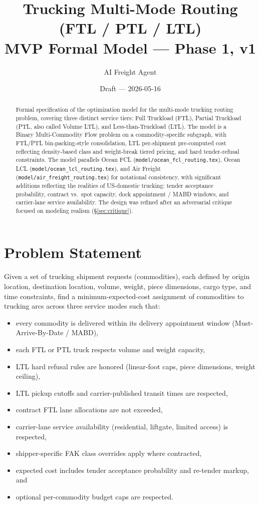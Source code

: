 \documentclass[11pt,a4paper]{article}
\title{\textbf{Trucking Multi-Mode Routing (FTL / PTL / LTL)}\\[0.4em]
\large MVP Formal Model --- Phase 1, v1}
\author{AI Freight Agent}
\date{Draft --- 2026-05-16}
\theoremstyle{definition}
\begin{document}
\maketitle

\begin{abstract}
Formal specification of the optimization model for the multi-mode trucking routing problem,
covering three distinct service tiers: Full Truckload (FTL), Partial Truckload (PTL, also
called Volume LTL), and Less-than-Truckload (LTL). The model is a Binary Multi-Commodity
Flow problem on a commodity-specific subgraph, with FTL/PTL bin-packing-style consolidation,
LTL per-shipment pre-computed cost reflecting density-based class and weight-break tiered
pricing, and hard tender-refusal constraints. The model parallels Ocean FCL
(\texttt{model/ocean\_fcl\_routing.tex}), Ocean LCL (\texttt{model/ocean\_lcl\_routing.tex}),
and Air Freight (\texttt{model/air\_freight\_routing.tex}) for notational consistency, with
significant additions reflecting the realities of US-domestic trucking: tender acceptance
probability, contract vs.\ spot capacity, dock appointment / MABD windows, and carrier-lane
service availability. The design was refined after an adversarial critique focused on
modeling realism (\S\ref{sec:critique}).
\end{abstract}

\tableofcontents
\newpage

\section{Problem Statement}

Given a set of trucking shipment requests (commodities), each defined by origin location,
destination location, volume, weight, piece dimensions, cargo type, and time constraints,
find a minimum-expected-cost assignment of commodities to trucking arcs across three service
modes such that:
\begin{itemize}[noitemsep]
  \item every commodity is delivered within its delivery appointment window
        (Must-Arrive-By-Date / MABD),
  \item each FTL or PTL truck respects volume and weight capacity,
  \item LTL hard refusal rules are honored (linear-foot caps, piece dimensions, weight ceiling),
  \item LTL pickup cutoffs and carrier-published transit times are respected,
  \item contract FTL lane allocations are not exceeded,
  \item carrier-lane service availability (residential, liftgate, limited access) is respected,
  \item shipper-specific FAK class overrides apply where contracted,
  \item expected cost includes tender acceptance probability and re-tender markup, and
  \item optional per-commodity budget caps are respected.
\end{itemize}
\end{document}
